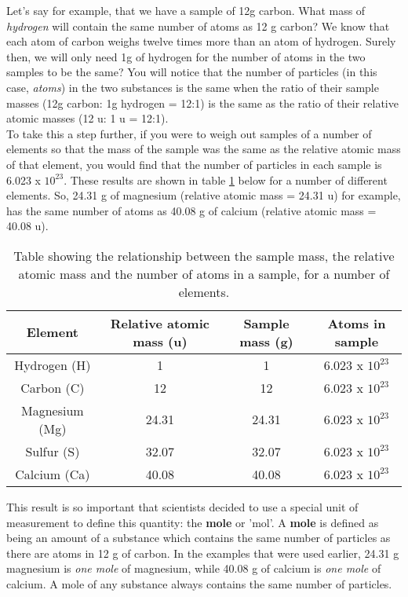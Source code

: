 Let's say for example, that we have a sample of 12g carbon. What mass of \textit{hydrogen} will contain the same number of atoms as 12 g carbon? We know that each atom of carbon weighs twelve times more than an atom of hydrogen. Surely then, we will only need 1g of hydrogen for the number of atoms in the two samples to be the same? You will notice that the number of particles (in this case, \textit{atoms}) in the two substances is the same when the ratio of their sample masses (12g carbon: 1g hydrogen = 12:1) is the same as the ratio of their relative atomic masses (12 u: 1 u = 12:1).\\

To take this a step further, if you were to weigh out samples of a number of elements so that the mass of the sample was the same as the relative atomic mass of that element, you would find that the number of particles in each sample is 6.023 x $10^{23}$. These results are shown in table \ref{tab:quant:atoms} below for a number of different elements. So, 24.31 g of magnesium (relative atomic mass = 24.31 u) for example, has the same number of atoms as 40.08 g of calcium (relative atomic mass = 40.08 u). \\

\begin{table}[!h]
\begin{center}
\caption{Table showing the relationship between the sample mass, the relative atomic mass and the number of atoms in a sample, for a number of elements.}
\label{tab:quant:atoms}
\begin{tabular}{|c|c|c|c|}\hline
\textbf{Element} & \textbf{Relative atomic mass (u)} & \textbf{Sample mass (g)} & \textbf{Atoms in sample}\\\hline
Hydrogen (H) & 1 & 1 & 6.023 x $10^{23}$\\\hline
Carbon (C) & 12 & 12 & 6.023 x $10^{23}$\\\hline
Magnesium (Mg) & 24.31 & 24.31 & 6.023 x $10^{23}$\\\hline
Sulfur (S) & 32.07 & 32.07 & 6.023 x $10^{23}$\\\hline
Calcium (Ca) & 40.08 & 40.08 & 6.023 x $10^{23}$\\\hline
\end{tabular}
\end{center}
\end{table}

This result is so important that scientists decided to use a special unit of measurement to define this quantity: the \textbf{mole} or 'mol'. A \textbf{mole} is defined as being an amount of a substance which contains the same number of particles as there are atoms in 12 g of carbon. In the examples that were used earlier, 24.31 g magnesium is \textit{one mole} of magnesium, while 40.08 g of calcium is \textit{one mole} of calcium. A mole of any substance always contains the same number of particles.   

